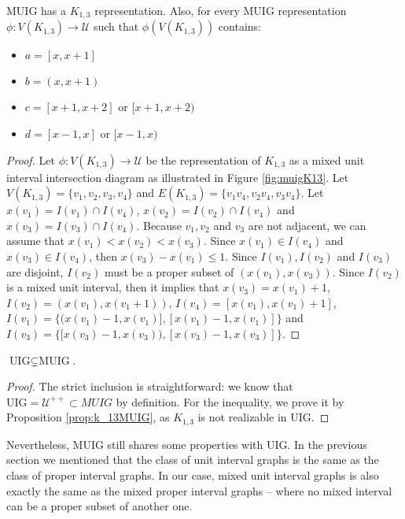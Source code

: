 \begin{prop}
  \label{prop:k_13MUIG}
  MUIG has a $K_{1,3}$ representation. Also, for every MUIG representation $\phi : V(K_{1,3}) \to \mathcal{U}$ such that $\phi(V(K_{1,3}))$ contains:

  \begin{itemize}
    \item $a = [x, x+1]$
    \item $b = (x, x+1)$
    \item $c = [x+1, x+2]$ or $[x+1, x+2)$
    \item $d = [x-1, x]$ or $[x-1, x)$
  \end{itemize}
\end{prop}

\begin{proof}
Let $\phi : V(K_{1,3}) \to \mathcal{U}$ be the representation of $K_{1,3}$ as a mixed unit interval intersection diagram as illustrated in Figure \ref{fig:muigK13}. Let $V(K_{1,3}) = \{v_1, v_2, v_3, v_4\}$ and $E(K_{1,3}) = \{v_1v_4, v_2v_4, v_3v_4\}$. Let $x(v_1) = I(v_1) \cap I(v_4)$, $x(v_2) = I(v_2) \cap I(v_4)$ and $x(v_3) = I(v_3) \cap I(v_4)$. Because $v_1, v_2$ and $v_3$ are not adjacent, we can assume that $x(v_1) < x(v_2) < x(v_3)$. Since $x(v_1) \in I(v_4)$ and $x(v_3) \in I(v_4)$, then $x(v_3) - x(v_1) \leqslant 1$. Since $I(v_1), I(v_2)$ and $I(v_3)$ are disjoint, $I(v_2)$ must be a proper subset of $(x(v_1), x(v_3))$. Since $I(v_2)$ is a mixed unit interval, then it implies that $x(v_3) = x(v_1) + 1$, $I(v_2) = (x(v_1), x(v_1+1))$, $I(v_4) = [x(v_1), x(v_1)+1]$, $I(v_1) = \{(x(v_1) -1, x(v_1)], [x(v_1) -1, x(v_1)]\}$ and $I(v_3) = \{[x(v_3) -1, x(v_3)), [x(v_3) -1, x(v_3)]\}$.
\end{proof}

\begin{theorem}
  $\text{UIG} \subsetneq \text{MUIG}$.
\end{theorem}

\begin{proof}
  The strict inclusion is straightforward: we know that $\text{UIG} = \mathcal{U}^{++} \subset MUIG$ by definition. For the inequality, we prove it by Proposition \ref{prop:k_13MUIG}, as $K_{1,3}$ is not realizable in UIG.
\end{proof}

Nevertheless, MUIG still shares some properties with UIG. In the previous section we mentioned that the class of unit interval graphs is the same as the class of proper interval graphs. In our case, mixed unit interval graphs is also exactly the same as the mixed proper interval graphs -- where no mixed interval can be a proper subset of another one.

